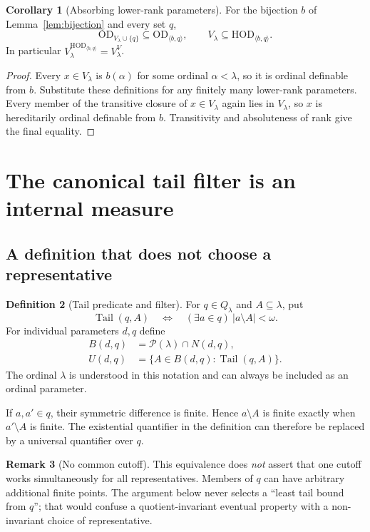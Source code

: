 \documentclass[11pt,letterpaper]{article}
\theoremstyle{definition}
\newtheorem{definition}{Definition}[section]
\newtheorem{corollary}[definition]{Corollary}
\newtheorem{remark}[definition]{Remark}
\newcommand{\OD}{\mathrm{OD}}
\newcommand{\HOD}{\mathrm{HOD}}
\newcommand{\Pow}{\mathcal P}
\newcommand{\tail}{\operatorname{Tail}}
\newcommand{\Npar}[2]{\HOD_{\langle #1,#2\rangle}}
\newcommand{\ODpar}[2]{\OD_{\langle #1,#2\rangle}}
\begin{document}
\begin{corollary}[Absorbing lower-rank parameters]\label{cor:absorb}
For the bijection $b$ of Lemma~\ref{lem:bijection} and every set $q$,
\[
 \OD_{V_\lambda\cup\{q\}}\subseteq\ODpar bq,
 \qquad V_\lambda\subseteq\Npar bq.
\]
In particular $V_\lambda^{\Npar bq}=V_\lambda^V$.
\end{corollary}

\begin{proof}
Every $x\in V_\lambda$ is $b(\alpha)$ for some ordinal $\alpha<\lambda$, so it is ordinal definable from $b$. Substitute these definitions for any finitely many lower-rank parameters. Every member of the transitive closure of $x\in V_\lambda$ again lies in $V_\lambda$, so $x$ is hereditarily ordinal definable from $b$. Transitivity and absoluteness of rank give the final equality.
\end{proof}

\section{The canonical tail filter is an internal measure}\label{sec:measure}

\subsection{A definition that does not choose a representative}

\begin{definition}[Tail predicate and filter]\label{def:filter}
For $q\in Q_\lambda$ and $A\subseteq\lambda$, put
\[
 \tail(q,A)\quad\Longleftrightarrow\quad
       (\exists a\in q)\ |a\setminus A|<\omega.
\]
For individual parameters $d,q$ define
\[
 \begin{split}
 B(d,q)&=\Pow(\lambda)\cap N(d,q),\\
 U(d,q)&=\{A\in B(d,q):\tail(q,A)\}.
 \end{split}
\]
The ordinal $\lambda$ is understood in this notation and can always be included as an ordinal parameter.
\end{definition}

If $a,a'\in q$, their symmetric difference is finite. Hence $a\setminus A$ is finite exactly when $a'\setminus A$ is finite. The existential quantifier in the definition can therefore be replaced by a universal quantifier over $q$.

\begin{remark}[No common cutoff]\label{rem:cutoff}
This equivalence does \emph{not} assert that one cutoff works simultaneously for all representatives. Members of $q$ can have arbitrary additional finite points. The argument below never selects a ``least tail bound from $q$''; that would confuse a quotient-invariant eventual property with a non-invariant choice of representative.
\end{remark}
\end{document}
